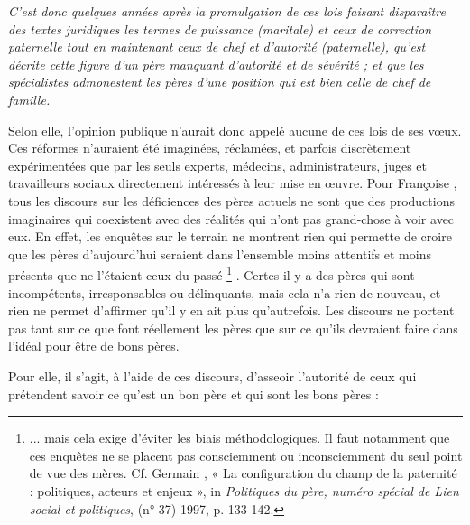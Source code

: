 \begin{displayquote}
\emph{C'est donc quelques années après la promulgation de ces lois faisant disparaître des textes juridiques les termes de puissance (maritale) et ceux de correction paternelle tout en maintenant ceux de chef et d'autorité (paternelle), qu'est décrite cette figure d'un père manquant d'autorité et de sévérité ; et que les spécialistes admonestent les pères d'une position qui est bien celle de chef de famille.}
\end{displayquote}

 Selon elle, l'opinion publique n'aurait donc appelé aucune de ces lois de ses vœux. Ces réformes n'auraient été imaginées, réclamées, et parfois discrètement expérimentées que par les seuls experts, médecins, administrateurs, juges et travailleurs sociaux directement intéressés à leur mise en œuvre. Pour Françoise , tous les discours sur les déficiences des pères actuels ne sont que des productions imaginaires qui coexistent avec des réalités qui n'ont pas grand-chose à voir avec eux. En effet, les enquêtes sur le terrain ne montrent rien qui permette de croire que les pères d'aujourd'hui seraient dans l'ensemble moins attentifs et moins présents que ne l'étaient ceux du passé%
\footnote{... mais cela exige d'éviter les biais méthodologiques. Il faut notamment que ces enquêtes ne se placent pas consciemment ou inconsciemment du seul point de vue des mères. Cf. Germain , « La configuration du champ de la paternité : politiques, acteurs et enjeux », in \emph{Politiques du père, numéro spécial de Lien social et politiques}, (n° 37) 1997, p. 133-142.}%
. Certes il y a des pères qui sont incompétents, irresponsables ou délinquants, mais cela n'a rien de nouveau, et rien ne permet d'affirmer qu'il y en ait plus qu'autrefois. Les discours ne portent pas tant sur ce que font réellement les pères que sur ce qu'ils devraient faire dans l'idéal pour être de bons pères. 

 Pour elle, il s'agit, à l'aide de ces discours, d'asseoir l'autorité de ceux qui prétendent savoir ce qu'est un bon père et qui sont les bons pères :
 
